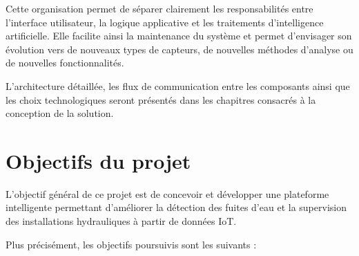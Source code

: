 Cette organisation permet de séparer clairement les responsabilités entre
l'interface utilisateur, la logique applicative et les traitements
d'intelligence artificielle. Elle facilite ainsi la maintenance du système
et permet d'envisager son évolution vers de nouveaux types de capteurs, de
nouvelles méthodes d'analyse ou de nouvelles fonctionnalités.

L'architecture détaillée, les flux de communication entre les composants
ainsi que les choix technologiques seront présentés dans les chapitres
consacrés à la conception de la solution.


\section{Objectifs du projet}

L'objectif général de ce projet est de concevoir et développer une plateforme
intelligente permettant d'améliorer la détection des fuites d'eau et la
supervision des installations hydrauliques à partir de données IoT.

Plus précisément, les objectifs poursuivis sont les suivants :

